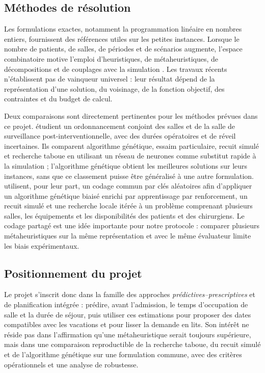 \subsection{Méthodes de résolution}

Les formulations exactes, notamment la programmation linéaire en nombres entiers, fournissent des références utiles sur les petites instances. Lorsque le nombre de patients, de salles, de périodes et de scénarios augmente, l'espace combinatoire motive l'emploi d'heuristiques, de métaheuristiques, de décompositions et de couplages avec la simulation \parencite{alamin2025}. Les travaux récents n'établissent pas de vainqueur universel : leur résultat dépend de la représentation d'une solution, du voisinage, de la fonction objectif, des contraintes et du budget de calcul.

Deux comparaisons sont directement pertinentes pour les méthodes prévues dans ce projet. \textcite{ahmadian2025} étudient un ordonnancement conjoint des salles et de la salle de surveillance post-interventionnelle, avec des durées opératoires et de réveil incertaines. Ils comparent algorithme génétique, essaim particulaire, recuit simulé et recherche taboue en utilisant un réseau de neurones comme substitut rapide à la simulation ; l'algorithme génétique obtient les meilleures solutions sur leurs instances, sans que ce classement puisse être généralisé à une autre formulation. \textcite{vieira2025} utilisent, pour leur part, un codage commun par clés aléatoires afin d'appliquer un algorithme génétique biaisé enrichi par apprentissage par renforcement, un recuit simulé et une recherche locale itérée à un problème comprenant plusieurs salles, les équipements et les disponibilités des patients et des chirurgiens. Le codage partagé est une idée importante pour notre protocole : comparer plusieurs métaheuristiques sur la même représentation et avec le même évaluateur limite les biais expérimentaux.

\subsection{Positionnement du projet}

Le projet s'inscrit donc dans la famille des approches \emph{prédictives--prescriptives} et de planification intégrée : prédire, avant l'admission, le temps d'occupation de salle et la durée de séjour, puis utiliser ces estimations pour proposer des dates compatibles avec les vacations et pour lisser la demande en lits. Son intérêt ne réside pas dans l'affirmation qu'une métaheuristique serait toujours supérieure, mais dans une comparaison reproductible de la recherche taboue, du recuit simulé et de l'algorithme génétique sur une formulation commune, avec des critères opérationnels et une analyse de robustesse.

